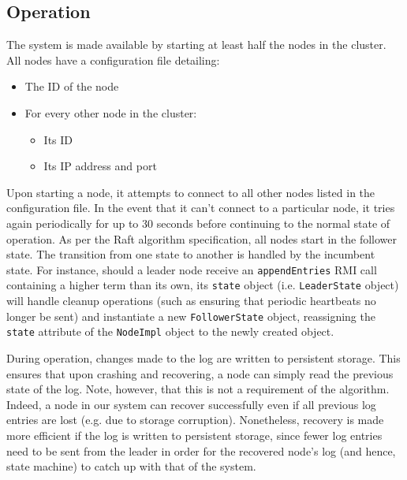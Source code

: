 \documentclass[12pt, a4paper]{article}
\begin{document}
\subsection{Operation}
The system is made available by starting at least half the nodes in the cluster. All nodes have a configuration file detailing:
\begin{itemize}
    \item The ID of the node
    \item For every other node in the cluster:
    \begin{itemize}
        \item Its ID
        \item Its IP address and port
    \end{itemize}
\end{itemize}
Upon starting a node, it attempts to connect to all other nodes listed in the configuration file. In the event that it can't connect to a particular node, it tries again periodically for up to 30 seconds before continuing to the normal state of operation. As per the Raft algorithm specification, all nodes start in the follower state. The transition from one state to another is handled by the incumbent state. For instance, should a leader node receive an \texttt{appendEntries} RMI call containing a higher term than its own, its \texttt{state} object (i.e. \texttt{LeaderState} object) will handle cleanup operations (such as ensuring that periodic heartbeats no longer be sent) and instantiate a new \texttt{FollowerState} object, reassigning the \texttt{state} attribute of the \texttt{NodeImpl} object to the newly created object.

During operation, changes made to the log are written to persistent storage. This ensures that upon crashing and recovering, a node can simply read the previous state of the log. Note, however, that this is not a requirement of the algorithm. Indeed, a node in our system can recover successfully even if all previous log entries are lost (e.g. due to storage corruption). Nonetheless, recovery is made more efficient if the log is written to persistent storage, since fewer log entries need to be sent from the leader in order for the recovered node's log (and hence, state machine) to catch up with that of the system.



\end{document}
